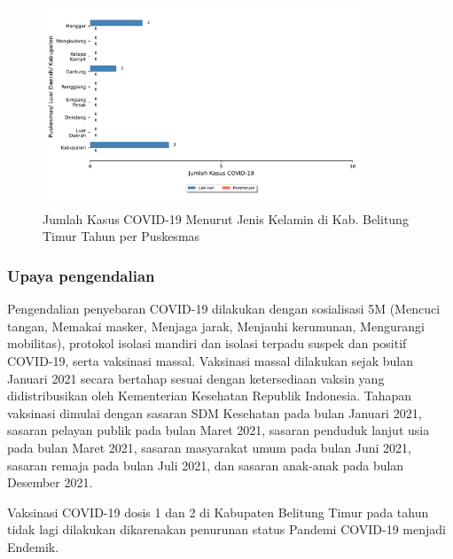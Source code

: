 \begin{figure}[H]
	\centering
	\includegraphics[width=0.85\textwidth]{bab_06/bab_06_17e_kasusCovidPerJK}
	\caption{Jumlah Kasus COVID-19 Menurut Jenis Kelamin di Kab. Belitung Timur Tahun \tP per Puskesmas}
	\label{fig:COVID-per-JK}
\end{figure}

\subsubsection{Upaya pengendalian}
Pengendalian penyebaran COVID-19 dilakukan dengan sosialisasi 5M (Mencuci tangan, Memakai masker, Menjaga jarak, Menjauhi kerumunan, Mengurangi mobilitas), protokol isolasi mandiri dan isolasi terpadu suspek dan positif COVID-19, serta vaksinasi massal. Vaksinasi massal dilakukan sejak bulan Januari 2021 secara bertahap sesuai dengan ketersediaan vaksin yang didistribusikan oleh Kementerian Kesehatan Republik Indonesia. Tahapan vaksinasi dimulai dengan sasaran SDM Kesehatan pada bulan Januari 2021, sasaran pelayan publik pada bulan Maret 2021, sasaran penduduk lanjut usia pada bulan Maret 2021, sasaran masyarakat umum pada bulan Juni 2021, sasaran remaja pada bulan Juli 2021, dan sasaran anak-anak pada bulan Desember 2021.

Vaksinasi COVID-19 dosis 1 dan 2 di Kabupaten Belitung Timur pada tahun \tP tidak lagi dilakukan dikarenakan penurunan status Pandemi COVID-19 menjadi Endemik.

%
